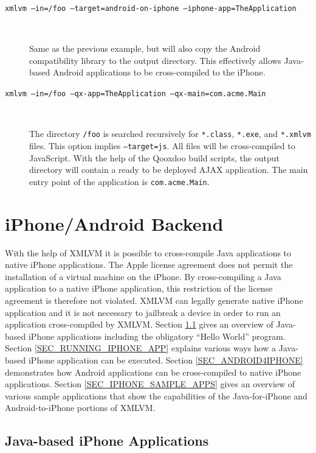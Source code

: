 \documentclass[11pt]{book}
\begin{document}
\begin{description}
\item[\texttt{xmlvm --in=/foo --target=android-on-iphone --iphone-app=TheApplication}] $ $

  Same as the previous example, but will also copy the Android
  compatibility library to the output directory. This effectively
  allows Java-based Android applications to be cross-compiled to the
  iPhone.

\item[\texttt{xmlvm --in=/foo --qx-app=TheApplication
    --qx-main=com.acme.Main}] $ $

  The directory \texttt{/foo} is searched recursively for
  \texttt{*.class}, \texttt{*.exe}, and \texttt{*.xmlvm} files. This
  option implies \texttt{--target=js}. All files will be
  cross-compiled to JavaScript. With the help of the Qooxdoo build
  scripts, the output directory will contain a ready to be deployed
  AJAX application. The main entry point of the application is
  \texttt{com.acme.Main}.

\end{description}



\chapter{iPhone/Android Backend}

With the help of XMLVM it is possible to cross-compile Java
applications to native iPhone applications. The Apple license
agreement does not permit the installation of a virtual machine on the
iPhone. By cross-compiling a Java application to a native iPhone
application, this restriction of the license agreement is therefore
not violated. XMLVM can legally generate native iPhone application and
it is not necessary to jailbreak a device in order to run an
application cross-compiled by XMLVM. Section \ref{SEC_IPHONE} gives an
overview of Java-based iPhone applications including the obligatory
``Hello World'' program. Section \ref{SEC_RUNNING_IPHONE_APP} explains
various ways how a Java-based iPhone application can be
executed. Section \ref{SEC_ANDROID4IPHONE} demonstrates how
Android applications can be cross-compiled to native iPhone
applications. Section \ref{SEC_IPHONE_SAMPLE_APPS} gives an overview
of various sample applications that show the capabilities of the
Java-for-iPhone and Android-to-iPhone portions of XMLVM.


\section{Java-based iPhone Applications}
\label{SEC_IPHONE}
\end{document}
